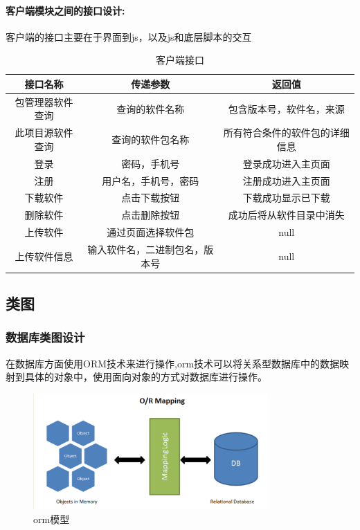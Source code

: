 \documentclass[supercite]{Experimental_Report}
\theoremstyle{definition}
\begin{document}
\paragraph*{客户端模块之间的接口设计:}
客户端的接口主要在于界面到js，以及js和底层脚本的交互
\begin{table}[h]
    \begin{center}
        \begin{tabular}{ccc}
            \toprule[1pt] 
            接口名称 & 传递参数 & 返回值\\ 
            \midrule[1pt]
            包管理器软件查询 &查询的软件名称& 包含版本号，软件名，来源\\
            此项目源软件查询 & 查询的软件包名称& 所有符合条件的软件包的详细信息\\
            登录&密码，手机号& 登录成功进入主页面\\
            注册&用户名，手机号，密码&注册成功进入主页面\\
            下载软件 & 点击下载按钮 & 下载成功显示已下载 \\
            删除软件 & 点击删除按钮 & 成功后将从软件目录中消失\\
            上传软件& 通过页面选择软件包 & null\\
            上传软件信息 & 输入软件名，二进制包名，版本号& null\\
            \bottomrule[1pt]
        \end{tabular}
        \caption{客户端接口}
        \label{table:server_api}
    \end{center}
\end{table}

\subsection{类图}

\subsubsection{数据库类图设计}

在数据库方面使用ORM技术来进行操作,orm技术可以将关系型数据库中的数据映射到具体的对象中，使用面向对象的方式对数据库进行操作。

\begin{figure}[!h]
    \centering
    \includegraphics[width=0.8\textwidth]{./images/orm.png}
    \caption{orm模型}
    \label{database}
\end{figure}
\end{document}

